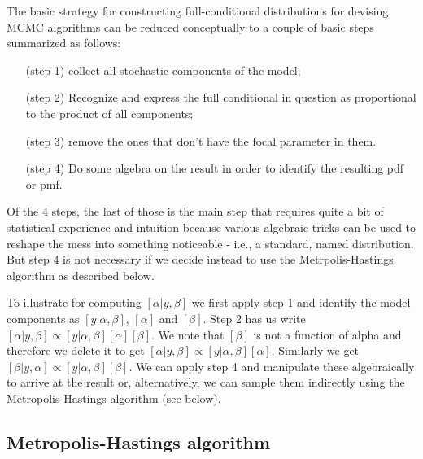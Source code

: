 The basic strategy for constructing full-conditional distributions for
devising MCMC algorithms can be reduced conceptually to a couple of
basic steps summarized as follows:
\begin{itemize}
\item[(step 1)] collect all stochastic components of the model; 
\item[(step 2)] Recognize and express the full conditional in question as proportional to the product of all  components; 
\item[(step 3)] remove the ones that don't have the focal parameter in them. 
\item[(step 4)] Do some algebra on the result in order to identify the resulting pdf or pmf. 
\end{itemize}
Of the 4 steps, the last of those is the main step that requires quite a bit of statistical experience and intuition because various algebraic tricks can be used to reshape the mess into something noticeable - i.e., a standard, named distribution. But step 4 is not necessary if we decide instead to use the Metrpolis-Hastings algorithm as described below. 


To illustrate for computing $[\alpha|y,\beta]$ we first apply step 1 and identify the model components as $[y|\alpha, \beta]$, $[\alpha]$ and $[\beta]$. Step 2 has us write $[\alpha|y,\beta] \propto [y|\alpha,\beta][\alpha][\beta]$.  We note that $[\beta]$ is not a function of alpha and therefore we delete it to get $[\alpha|y,\beta] \propto [y|\alpha,\beta][\alpha]$. Similarly we get $[\beta|y,\alpha] \propto [y|\alpha,\beta][\beta]$. We can apply step 4 and manipulate these algebraically to arrive at the result or, alternatively, we can sample them indirectly using the Metropolis-Hastings algorithm (see below).   


\subsection{Metropolis-Hastings algorithm}
 
